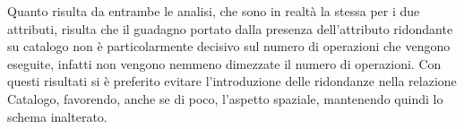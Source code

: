 \begin{table}[H]
\centering
\caption{Costo Operazioni con ridondanza}
\label{my-label}
\end{table}


\begin{table}[H]
\centering
\caption{Costo Operazioni senza ridondanza}
\label{my-label}
\end{table}

\vspace{1cm}
\noindent
Quanto risulta da entrambe le analisi, che sono in realtà la stessa per i due attributi, risulta che il guadagno portato dalla presenza dell'attributo ridondante su catalogo non è particolarmente decisivo sul numero di operazioni che vengono eseguite, infatti non vengono nemmeno dimezzate il numero di operazioni. Con questi risultati si è preferito evitare l'introduzione delle ridondanze nella relazione Catalogo, favorendo, anche se di poco, l'aspetto spaziale, mantenendo quindi lo schema inalterato.


